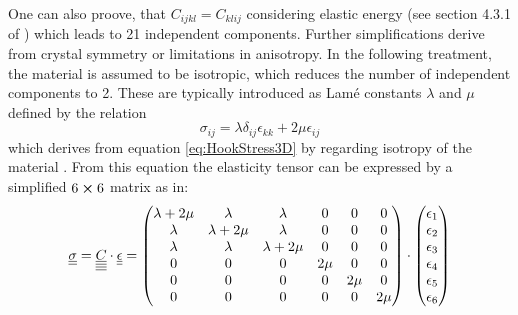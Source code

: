 One can also proove, that $C_{ijkl} = C_{klij}$ considering elastic energy (see
section 4.3.1 of \cite{GrossMarx2014}) which leads to 21 independent
components. Further simplifications derive from crystal symmetry or
limitations in anisotropy. In the following treatment, the material is assumed
to be isotropic, which reduces the number of independent components to 2. These
are typically introduced as Lamé constants $\lambda$ and $\mu$ defined by the
relation
\begin{equation} \label{eq:StressStrainIso_tensor}
    \sigma_{ij} = \lambda \delta_{ij} \epsilon_{kk} + 2\mu \epsilon_{ij}
\end{equation}
which derives from equation \ref{eq:HookStress3D} by regarding isotropy of the
material \cite{kundu2012ultrasonic}. From this equation the elasticity tensor
can be expressed by a simplified $6\cross6$ matrix as in:
\begin{equation} \label{eq:StressStrainIso}
    \underline{\underline{\sigma}} = \underline{\underline{\underline{\underline{C}}}}\cdot \underline{\underline{\epsilon}} =
    \begin{pmatrix}
        \lambda + 2\mu & \lambda        & \lambda        & 0    & 0    & 0
        \\
        \lambda        & \lambda + 2\mu & \lambda        & 0    & 0    & 0
        \\
        \lambda        & \lambda        & \lambda + 2\mu & 0    & 0    & 0
        \\
        0              & 0              & 0              & 2\mu & 0    & 0
        \\
        0              & 0              & 0              & 0    & 2\mu & 0
        \\
        0              & 0              & 0              & 0    & 0    & 2\mu
        \\
    \end{pmatrix}
    \cdot
    \begin{pmatrix}
        \epsilon_1 \\ \epsilon_2 \\ \epsilon_3 \\ \epsilon_4 \\ \epsilon_5 \\
        \epsilon_6 \\
    \end{pmatrix}
\end{equation}

